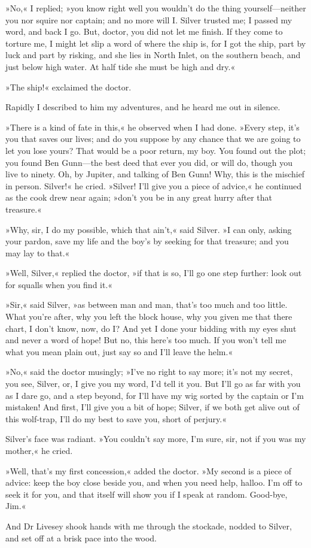 »No,« I replied; »you know right well you wouldn't do the thing yourself—neither you nor squire nor captain; and no more will I. Silver trusted me; I passed my word, and back I go. But, doctor, you did not let me finish. If they come to torture me, I might let slip a word of where the ship is, for I got the ship, part by luck and part by risking, and she lies in North Inlet, on the southern beach, and just below high water. At half tide she must be high and dry.«

»The ship!« exclaimed the doctor.

Rapidly I described to him my adventures, and he heard me out in silence.

»There is a kind of fate in this,« he observed when I had done. »Every step, it's you that saves our lives; and do you suppose by any chance that we are going to let you lose yours? That would be a poor return, my boy. You found out the plot; you found Ben Gunn—the best deed that ever you did, or will do, though you live to ninety. Oh, by Jupiter, and talking of Ben Gunn! Why, this is the mischief in person. Silver!« he cried. »Silver! I'll give you a piece of advice,« he continued as the cook drew near again; »don't you be in any great hurry after that treasure.«

»Why, sir, I do my possible, which that ain't,« said Silver. »I can only, asking your pardon, save my life and the boy's by seeking for that treasure; and you may lay to that.«

»Well, Silver,« replied the doctor, »if that is so, I'll go one step further: look out for squalls when you find it.«

»Sir,« said Silver, »as between man and man, that's too much and too little. What you're after, why you left the block house, why you given me that there chart, I don't know, now, do I? And yet I done your bidding with my eyes shut and never a word of hope! But no, this here's too much. If you won't tell me what you mean plain out, just say so and I'll leave the helm.«

»No,« said the doctor musingly; »I've no right to say more; it's not my secret, you see, Silver, or, I give you my word, I'd tell it you. But I'll go as far with you as I dare go, and a step beyond, for I'll have my wig sorted by the captain or I'm mistaken! And first, I'll give you a bit of hope; Silver, if we both get alive out of this wolf-trap, I'll do my best to save you, short of perjury.«

Silver's face was radiant. »You couldn't say more, I'm sure, sir, not if you was my mother,« he cried.

»Well, that's my first concession,« added the doctor. »My second is a piece of advice: keep the boy close beside you, and when you need help, halloo. I'm off to seek it for you, and that itself will show you if I speak at random. Good-bye, Jim.«

And Dr Livesey shook hands with me through the stockade, nodded to Silver, and set off at a brisk pace into the wood.